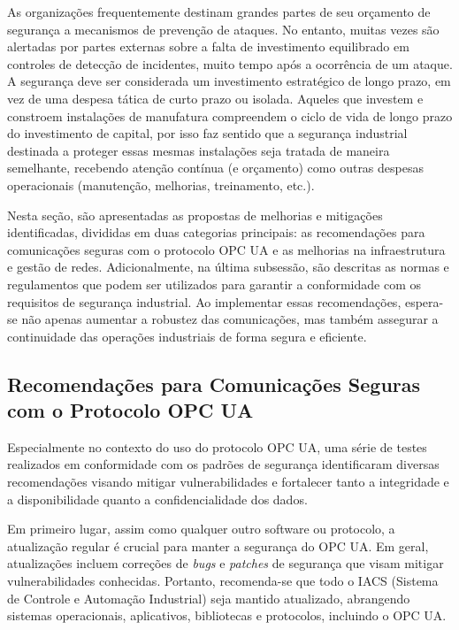    As organizações frequentemente destinam grandes partes de seu orçamento de segurança a mecanismos de prevenção de ataques. No entanto, muitas vezes são alertadas por partes externas sobre a falta de investimento equilibrado em controles de detecção de incidentes, muito tempo após a ocorrência de um ataque. A segurança deve ser considerada um investimento estratégico de longo prazo, em vez de uma despesa tática de curto prazo ou isolada. Aqueles que investem e constroem instalações de manufatura compreendem o ciclo de vida de longo prazo do investimento de capital, por isso faz sentido que a segurança industrial destinada a proteger essas mesmas instalações seja tratada de maneira semelhante, recebendo atenção contínua (e orçamento) como outras despesas operacionais (manutenção, melhorias, treinamento, etc.).

    Nesta seção, são apresentadas as propostas de melhorias e mitigações identificadas, divididas em duas categorias principais: as recomendações para comunicações seguras com o protocolo OPC UA e as melhorias na infraestrutura e gestão de redes. Adicionalmente, na última subsessão, são descritas as normas e regulamentos que podem ser utilizados para garantir a conformidade com os requisitos de segurança industrial. Ao implementar essas recomendações, espera-se não apenas aumentar a robustez das comunicações, mas também assegurar a continuidade das operações industriais de forma segura e eficiente.

    \subsection{Recomendações para Comunicações Seguras com o Protocolo OPC UA}

        Especialmente no contexto do uso do protocolo OPC UA, uma série de testes realizados em conformidade com os padrões de segurança identificaram diversas recomendações visando mitigar vulnerabilidades e fortalecer tanto a integridade e a disponibilidade quanto a confidencialidade dos dados.

        Em primeiro lugar, assim como qualquer outro software ou protocolo, a atualização regular é crucial para manter a segurança do OPC UA. Em geral, atualizações incluem correções de \textit{bugs} e \textit{patches} de segurança que visam mitigar vulnerabilidades conhecidas. Portanto, recomenda-se que todo o IACS (Sistema de Controle e Automação Industrial) seja mantido atualizado, abrangendo sistemas operacionais, aplicativos, bibliotecas e protocolos, incluindo o OPC UA.
        

